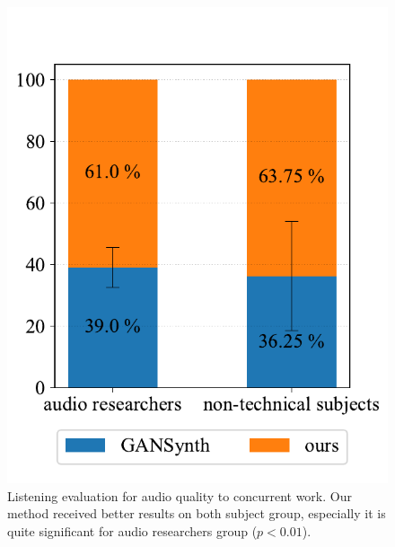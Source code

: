 \begin{figure}[t]
    \centering
    \includegraphics[width=0.8\linewidth]{assets/figures/quality_result.pdf}
    \caption{Listening evaluation for audio quality to concurrent work. Our method received better results on both subject group, especially it is quite significant for audio researchers group ($p < 0.01$).}
    \label{fig:quality_result}
\end{figure}
